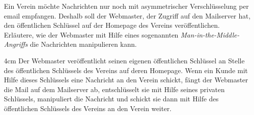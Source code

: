 \question[3]
Ein Verein möchte Nachrichten nur noch mit asymmetrischer Verschlüsselung per email empfangen. Deshalb soll der Webmaster,
 der Zugriff auf den Mailserver hat, den öffentlichen Schlüssel auf der Homepage des Vereins veröffentlichen. 
Erläutere, wie der Webmaster mit Hilfe eines sogenannten \textit{Man-in-the-Middle-Angriffs} die Nachrichten manipulieren kann.

\begin{solutionbox}{4cm}
Der Webmaster veröffentlicht seinen eigenen öffentlichen Schlüssel an Stelle des öffentlichen Schlüssels
des Vereins auf deren Homepage. Wenn ein Kunde mit Hilfe dieses Schlüssels eine Nachricht an den Verein schickt, fängt der Webmaster die Mail auf dem Mailserver ab, entschlüsselt
sie mit Hilfe seines privaten Schlüssels, manipuliert die Nachricht und schickt sie dann mit Hilfe des
öffentlichen Schlüssels des Vereins an den Verein weiter.
\end{solutionbox}
